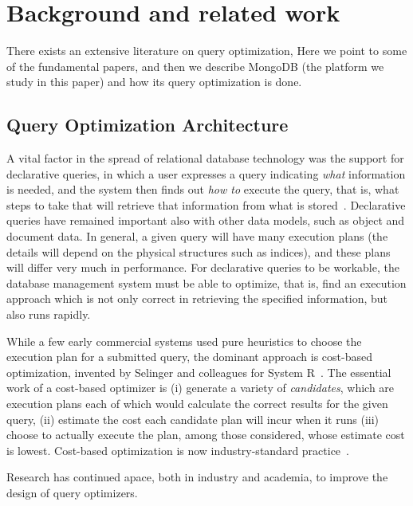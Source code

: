 \section{Background and related work}
\label{sec:background}
There exists an extensive literature on query
optimization, Here we point to some of the fundamental papers, and then we describe MongoDB (the platform we study in this paper) and how its \approachName query optimization is done.




\subsection{Query Optimization Architecture}

A vital factor in the spread of relational database technology was the support for declarative queries, in which a user expresses a query indicating {\it what} information is needed, and the system then finds out {\it how to} execute the query, that is, what steps to take that will retrieve that information from what is stored~\cite{Codd70}. Declarative queries have remained important also with other data models, such as object and document data. In general, a given query will have many execution plans (the details will depend on the physical structures such as indices), and these plans will differ very much in performance. For declarative queries to be workable, the database management system must be able to optimize, that is, find an execution approach which is not only correct in retrieving the specified information, but also runs rapidly.

While a few early commercial systems used pure heuristics to choose the execution plan for a submitted query, the dominant approach is cost-based optimization, invented by Selinger and colleagues for System R~\cite{SelingerACLP79}. The essential work of a cost-based optimizer is (i) generate a variety of  \emph{candidates}, which are execution plans each of which would calculate the correct results for the given query, (ii) estimate the cost each candidate plan will incur when it runs (iii) choose to actually execute the plan, among those considered, whose estimate cost is lowest. Cost-based optimization is now industry-standard practice~\cite{lahdenmaki2005relational}.

Research has continued apace, both in industry and academia, to improve the design of query optimizers.

